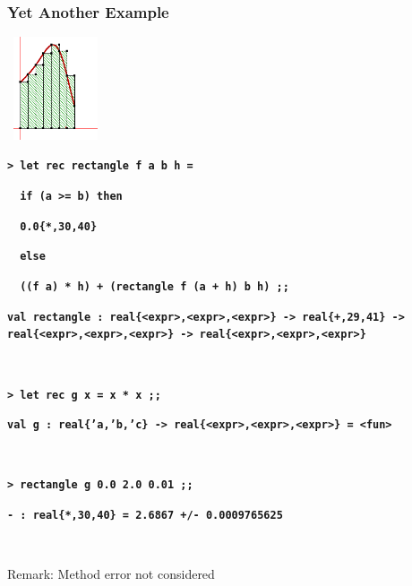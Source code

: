 \documentclass[handout,t]{beamer}
\def\mytt#1{\texttt{\textbf{#1}}}
\def\real#1{real\{#1\}}
\begin{document}
\begin{frame}
\frametitle{Yet Another Example}

~\hfill\includegraphics[width=2.5cm]{rect.png}

\vspace{-1.5cm}

\scriptsize
\color{blue}


\mytt{> let rec rectangle f a b h =}

~\hspace{0.5cm}\mytt{  if (a >= b) then }

~\hspace{1cm}\mytt{    0.0\{*,30,40\}}

~\hspace{0.5cm}\mytt{  else}

~\hspace{1cm}\mytt{    ((f a) * h) + (rectangle f (a + h) b h) ;;}

\mytt{\color{red}val rectangle : \real{<expr>,<expr>,<expr>} -> \real{+,29,41} -> \real{<expr>,<expr>,<expr>} -> \real{<expr>,<expr>,<expr>}
}

\mytt{\ }

\mytt{> let rec g x = x * x ;;}

\mytt{\color{red}val g : \real{'a,'b,'c} -> \real{<expr>,<expr>,<expr>} = <fun>}

\mytt{\ }

\mytt{> rectangle g 0.0 2.0 0.01 ;;}

\mytt{\color{red}- : \real{*,30,40} = 2.6867 +/- 0.0009765625}

\mytt{\ }

\color{black}\normalsize

\centerline{Remark: Method error not considered}

\end{frame}



%
\end{document}
